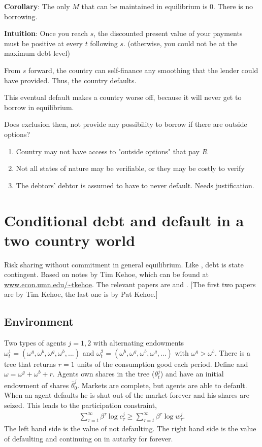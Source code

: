 \documentclass[11pt, pdftex]{article}
\begin{document}
\textbf{Corollary}: The only $M$ that can be maintained in equilibrium is 0.  There is no borrowing.

\textbf{Intuition}:
Once you reach $s$, the discounted present value of your payments must be positive at every $t$ following $s$.  (otherwise, you could not be at the maximum debt level)

From $s$ forward, the country can self-finance any smoothing that the lender could have provided.  Thus, the country defaults.

This eventual default makes a country worse off, because it will never get to borrow in equilibrium.

Does exclusion then, not provide any possibility to borrow if there are outside options?
    \begin{enumerate}
	\item  Country may not have access to "outside options" that pay $R$
	\item  Not all states of nature may be verifiable, or they may be costly to verify
	\item  The debtors' debtor is assumed to have to never default.  Needs justification.
    \end{enumerate}

\section{Conditional debt and default in a two country world}
Risk sharing without commitment in general equilibrium. Like \citet{EG81}, debt is state contingent.  Based on notes by Tim Kehoe, which can be found at \url{www.econ.umn.edu/~tkehoe}. The relevant papers are \citet{KL01} and \citet{Kehoe2002}. [The first two papers are by Tim Kehoe, the last one is by Pat Kehoe.]

\subsection*{Environment}
Two types of agents $j = 1,2$ with alternating endowments $\omega _t^1 = \left( {{\omega ^g},{\omega ^b},{\omega ^g},{\omega ^b},...} \right)$ and $\omega _t^2 = \left( {{\omega ^b},{\omega ^g},{\omega ^b},{\omega ^g},...} \right)$ with ${\omega ^g} > {\omega ^b}$.  There is a tree that returns $r = 1$ units of the consumption good each period.  Define and $\omega  = {\omega ^g} + {\omega ^b} + r$. Agents own shares in the tree ($\theta _t^j$) and have an initial endowment of shares $\bar \theta _0^j$.  Markets are complete, but agents are able to default.  When an agent defaults he is shut out of the market forever and his shares are seized.  This leads to the participation constraint,
\begin{align}\label{}
\sum_{\tau  = t}^\infty  {{\beta ^\tau }\log c_\tau ^j}  \geq \sum_{\tau  = t}^\infty  {{\beta ^\tau }\log w_\tau ^j}.
\end{align}
The left hand side is the value of not defaulting.  The right hand side is the value of defaulting and continuing on in autarky for forever.
\end{document}
